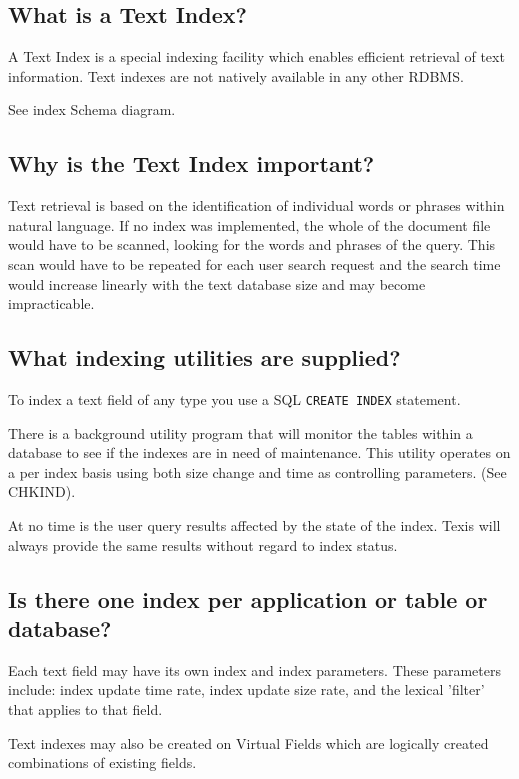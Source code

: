 \subsection{What is a Text Index?}

A Text Index is a special indexing facility which enables efficient
retrieval of text information.
 Text indexes are not natively available in
any other RDBMS.

See index Schema diagram.

\subsection{Why is the Text Index important?}

Text retrieval is based on the identification of individual words or
phrases within natural language.  If no index was implemented, the whole
of the document file would have to be scanned, looking for the words and
phrases of the query.  This scan would have to be repeated for each user
search request and the search time would increase linearly with the text
database size and may become impracticable.

\subsection{What indexing utilities are supplied?}

To index a text field of any type you use a SQL {\tt CREATE INDEX} statement.

There is a background utility program that will monitor the tables within
a database to see if the indexes are in need of maintenance. This utility
operates on a per index basis using both size change and time as
controlling parameters.
(See CHKIND).

At no time is the user query results affected by the state of the index.
Texis will always provide the same results without regard to index status.

\subsection{Is there one index per application or table or database?}

Each text field may have its own index and index parameters.  These parameters
include:  index update time rate, index update size rate, and the lexical
'filter' that applies to that field.

Text indexes may also be created on Virtual Fields which are logically created
combinations of existing fields.

